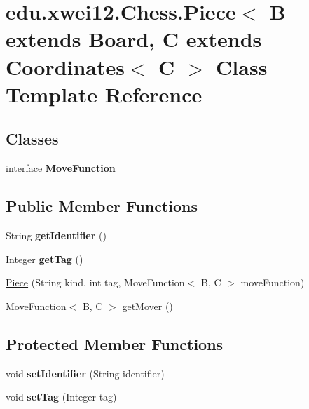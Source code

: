 \hypertarget{classedu_1_1xwei12_1_1_chess_1_1_piece}{}\section{edu.\+xwei12.\+Chess.\+Piece$<$ B extends Board, C extends Coordinates$<$ C $>$ Class Template Reference}
\label{classedu_1_1xwei12_1_1_chess_1_1_piece}
\subsection*{Classes}
\begin{DoxyCompactItemize}
\item 
interface {\bfseries Move\+Function}
\end{DoxyCompactItemize}
\subsection*{Public Member Functions}
\begin{DoxyCompactItemize}
\item 
String {\bfseries get\+Identifier} ()\hypertarget{classedu_1_1xwei12_1_1_chess_1_1_piece_ae4c3f67c7d0c481eb6626a701e567285}{}\label{classedu_1_1xwei12_1_1_chess_1_1_piece_ae4c3f67c7d0c481eb6626a701e567285}

\item 
Integer {\bfseries get\+Tag} ()\hypertarget{classedu_1_1xwei12_1_1_chess_1_1_piece_a55c64c1616559de0c233b37c6a258276}{}\label{classedu_1_1xwei12_1_1_chess_1_1_piece_a55c64c1616559de0c233b37c6a258276}

\item 
\hyperlink{classedu_1_1xwei12_1_1_chess_1_1_piece_a8e99c05d682f35cdf5e38da3aa4212a9}{Piece} (String kind, int tag, Move\+Function$<$ B, C $>$ move\+Function)
\item 
Move\+Function$<$ B, C $>$ \hyperlink{classedu_1_1xwei12_1_1_chess_1_1_piece_ab4f4f8f58b85204ff64bde29e9c6e6cb}{get\+Mover} ()
\end{DoxyCompactItemize}
\subsection*{Protected Member Functions}
\begin{DoxyCompactItemize}
\item 
void {\bfseries set\+Identifier} (String identifier)\hypertarget{classedu_1_1xwei12_1_1_chess_1_1_piece_ac62e8b26b33259f92879092cb1cb9965}{}\label{classedu_1_1xwei12_1_1_chess_1_1_piece_ac62e8b26b33259f92879092cb1cb9965}

\item 
void {\bfseries set\+Tag} (Integer tag)\hypertarget{classedu_1_1xwei12_1_1_chess_1_1_piece_a08ab7933898c00c8ebaf08338a1a2d87}{}\label{classedu_1_1xwei12_1_1_chess_1_1_piece_a08ab7933898c00c8ebaf08338a1a2d87}

\end{DoxyCompactItemize}


